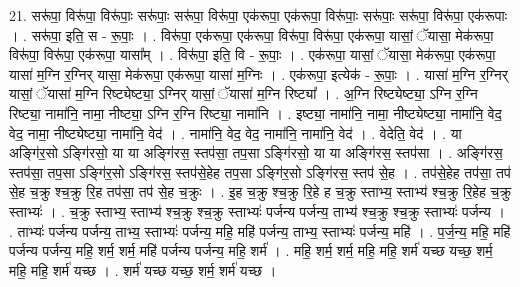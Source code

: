 \documentclass[17pt]{extarticle}
\begin{document}
21. सरू॑पा॒ विरू॑पा॒ विरू॑पाः॒ सरू॑पाः॒ सरू॑पा॒ विरू॑पा॒ एक॑रूपा॒ एक॑रूपा॒ विरू॑पाः॒ सरू॑पाः॒ सरू॑पा॒ विरू॑पा॒ एक॑रूपाः । . सरू॑पा॒ इति॒ स - रू॒पाः॒ । . विरू॑पा॒ एक॑रूपा॒ एक॑रूपा॒ विरू॑पा॒ विरू॑पा॒ एक॑रूपा॒ यासां॒ ॅयासा॒ मेक॑रूपा॒ विरू॑पा॒ विरू॑पा॒ एक॑रूपा॒ यासा᳚म् । . विरू॑पा॒ इति॒ वि - रू॒पाः॒ । . एक॑रूपा॒ यासां॒ ॅयासा॒ मेक॑रूपा॒ एक॑रूपा॒ यासा॑ म॒ग्नि र॒ग्निर् यासा॒ मेक॑रूपा॒ एक॑रूपा॒ यासा॑ म॒ग्निः । . एक॑रूपा॒ इत्येक॑ - रू॒पाः॒ । . यासा॑ म॒ग्नि र॒ग्निर् यासां॒ ॅयासा॑ म॒ग्नि रिष्ट्येष्ट्या॒ ऽग्निर् यासां॒ ॅयासा॑ म॒ग्नि रिष्ट्या᳚ । . अ॒ग्नि रिष्ट्येष्ट्या॒ ऽग्नि र॒ग्नि रिष्ट्या॒ नामा॑नि॒ नामा॒ नीष्ट्या॒ ऽग्नि र॒ग्नि रिष्ट्या॒ नामा॑नि । . इष्ट्या॒ नामा॑नि॒ नामा॒ नीष्ट्येष्ट्या॒ नामा॑नि॒ वेद॒ वेद॒ नामा॒ नीष्ट्येष्ट्या॒ नामा॑नि॒ वेद॑ । . नामा॑नि॒ वेद॒ वेद॒ नामा॑नि॒ नामा॑नि॒ वेद॑ । . वेदेति॒ वेद॑ । . या अङ्गि॑र॒सो ऽङ्गि॑रसो॒ या या अङ्गि॑रस॒ स्तप॑सा॒ तप॒सा ऽङ्गि॑रसो॒ या या अङ्गि॑रस॒ स्तप॑सा । . अङ्गि॑रस॒ स्तप॑सा॒ तप॒सा ऽङ्गि॑र॒सो ऽङ्गि॑रस॒ स्तप॑से॒हेह तप॒सा ऽङ्गि॑र॒सो ऽङ्गि॑रस॒ स्तप॑ से॒ह । . तप॑से॒हेह तप॑सा॒ तप॑ से॒ह च॒क्रु श्च॒क्रु रि॒ह तप॑सा॒ तप॑ से॒ह च॒क्रुः । . इ॒ह च॒क्रु श्च॒क्रु रि॒हे ह च॒क्रु स्ताभ्य॒ स्ताभ्य॑ श्च॒क्रु रि॒हेह च॒क्रु स्ताभ्यः॑ । . च॒क्रु स्ताभ्य॒ स्ताभ्य॑ श्च॒क्रु श्च॒क्रु स्ताभ्यः॑ पर्जन्य पर्जन्य॒ ताभ्य॑ श्च॒क्रु श्च॒क्रु स्ताभ्यः॑ पर्जन्य । . ताभ्यः॑ पर्जन्य पर्जन्य॒ ताभ्य॒ स्ताभ्यः॑ पर्जन्य॒ महि॒ महि॑ पर्जन्य॒ ताभ्य॒ स्ताभ्यः॑ पर्जन्य॒ महि॑ । . प॒र्ज॒न्य॒ महि॒ महि॑ पर्जन्य पर्जन्य॒ महि॒ शर्म॒ शर्म॒ महि॑ पर्जन्य पर्जन्य॒ महि॒ शर्म॑ । . महि॒ शर्म॒ शर्म॒ महि॒ महि॒ शर्म॑ यच्छ यच्छ॒ शर्म॒ महि॒ महि॒ शर्म॑ यच्छ । . शर्म॑ यच्छ यच्छ॒ शर्म॒ शर्म॑ यच्छ । \newline
\end{document}
